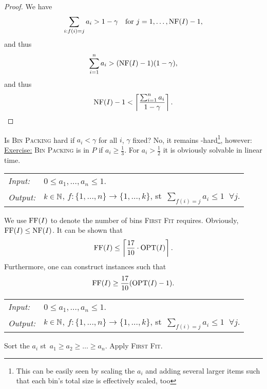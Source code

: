 \documentclass[../skript.tex]{subfiles}
\begin{document}
\begin{proof}\tabularnewline
We have
\[
	\sum_{i \mathrel{}:\mathrel{} f(i) = j} a_i > 1-\gamma \quad \text{for } j = 1, \ldots, \operatorname{NF}(I) -1,
\]
and thus
\[
	\sum_{i=1}^n a_i > (\operatorname{NF}(I) - 1)(1-\gamma),
\]
and thus
\[
	\operatorname{NF}(I) - 1 < \left\lceil \frac{\sum_{i=1}^n a_i}{1-\gamma} \right\rceil.
\]
\end{proof}
Is \textsc{Bin Packing} hard if $a_i < \gamma$ for all $i$, $\gamma$ fixed? No, it remains \NP-hard\footnote{This can be easily seen by scaling the $a_i$ and adding several larger items such that each bin's total size is effectively scaled, too}, however:
\underline{Exercise:} \textsc{Bin Packing} is in $P$ if $a_i \geq \frac{1}{3}$. For $a_i > \frac{1}{2}$ it is obviously solvable in linear time.
\begin{samepage}
\begin{algorithmbox}
\begin{tabular}{@{}ll}
\textit{Input:} & $0 \leq a_1, \ldots, a_n \leq 1$. \\
\textit{Output:} & $k \in \mathbb{N}$, $f : \{ 1, \ldots, n\} \to \{ 1, \ldots, k\}$, \ac{st}\ $\sum_{f(i) = j} a_i \leq 1 \;\; \forall j$.
\end{tabular}
\end{algorithmbox}
\vspace{-7pt}
\begin{algorithm}[H]
\end{algorithm}
\vspace{-7pt}
\EndAlgorithmLine
\end{samepage}
We use $\operatorname{FF}(I)$ to denote the number of bins \textsc{First Fit} requires. Obviously, $\operatorname{FF}(I) \leq \operatorname{NF}(I)$.
It can be shown that
\[
	\operatorname{FF}(I) \leq \left\lceil \frac{17}{10} \cdot \operatorname{OPT}(I) \right\rceil.
\]
Furthermore, one can construct instances such that
\[
	\operatorname{FF}(I) \geq \frac{17}{10} (\operatorname{OPT}(I) - 1).
\]
\begin{samepage}
\begin{algorithmbox}
\begin{tabular}{@{}ll}
\textit{Input:} & $0 \leq a_1, \ldots, a_n \leq 1$. \\
\textit{Output:} & $k \in \mathbb{N}$, $f : \{ 1, \ldots, n\} \to \{ 1, \ldots, k\}$, \ac{st}\ $\sum_{f(i) = j} a_i \leq 1 \;\; \forall j$.
\end{tabular}
\end{algorithmbox}
\vspace{-7pt}
\begin{algorithm}[H]
Sort the $a_i$ \ac{st}\ $a_1 \geq a_2 \geq \ldots \geq a_n$.\;
Apply \textsc{First Fit}.
\end{algorithm}
\vspace{-7pt}
\EndAlgorithmLine
\end{samepage}
\end{document}

